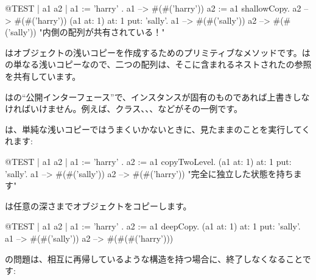 \documentclass[a4paper,10pt,twoside]{book}
\begin{document}
\begin{code}{@TEST | a1 a2 |}
a1 := { { 'harry' } }.
a1 --> #(#('harry'))
a2 := a1 shallowCopy.
a2 --> #(#('harry'))
(a1 at: 1) at: 1 put: 'sally'.
a1 --> #(#('sally'))
a2 --> #(#('sally'))    "内側の配列が共有されている！"
\end{code}

はオブジェクトの浅いコピーを作成するためのプリミティブなメソッドです。はの単なる浅いコピーなので、二つの配列は、そこに含まれるネストされたの参照を共有しています。

はの``公開インターフェース''で、インスタンスが固有のものであれば上書きしなければいけません。例えば、クラス、、、などがその一例です。

は、単純な浅いコピーではうまくいかないときに、見たままのことを実行してくれます:

\begin{code}{@TEST | a1 a2 |}
a1 := { { 'harry' } } .
a2 := a1 copyTwoLevel.
(a1 at: 1) at: 1 put: 'sally'.
a1 --> #(#('sally'))
a2 --> #(#('harry'))    "完全に独立した状態を持ちます"
\end{code}

は任意の深さまでオブジェクトをコピーします。

\begin{code}{@TEST | a1 a2 |}
a1 := { { { 'harry' } } } .
a2 := a1 deepCopy.
(a1 at: 1) at: 1 put: 'sally'.
a1 --> #(#('sally'))
a2 --> #(#(#('harry')))
\end{code}

の問題は、相互に再帰しているような構造を持つ場合に、終了しなくなることです:
\end{document}
